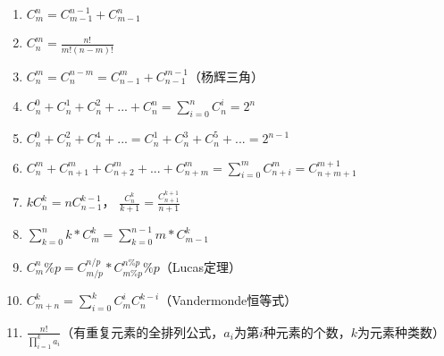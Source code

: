 \begin{enumerate}
	\item $C_m^n=C_{m-1}^{n-1}+C_{m-1}^n$
	\item $C_n^m = \frac{n!}{m!(n-m)!}$ 
	\item $C_n^m = C_n^{n-m} = C^{m}_{n-1} + C^{m-1}_{n-1}$（杨辉三角）
	\item $C_n^0+C_n^1+C_n^2+...+C_n^n = \sum_{i=0}^{n}{C_n^i} = 2^n$
	\item $C_n^0+C_n^2+C_n^4+... = C_n^1+C_n^3+C_n^5+... = 2^{n-1}$
	\item $C_n^m+C_{n+1}^m+C_{n+2}^m+...+C_{n+m}^m = \sum_{i=0}^{m}C_{n+i}^{m} = C_{n+m+1}^{m+1}$
	\item $k C_n^k = nC_{n-1}^{k-1}$， $\frac{C_n^k}{k+1} = \frac{C_{n+1}^{k+1}}{n+1}$
	\item $\sum\limits_{k=0}^nk*C_m^k=\sum\limits_{k=0}^{n-1}m*C_{m-1}^k$
	\item $C_m^n\%p=C_{m/p}^{n/p}*C_{m\%p}^{n\%p}\%p$（Lucas定理）
	\item $C_{m+n}^k=\sum\limits_{i=0}^kC_m^iC_n^{k-i}$（Vandermonde恒等式）
	\item $\frac{n!}{\prod\limits^k_{i=1}a_i}$（有重复元素的全排列公式，$a_i$为第$i$种元素的个数，$k$为元素种类数）
\end{enumerate}